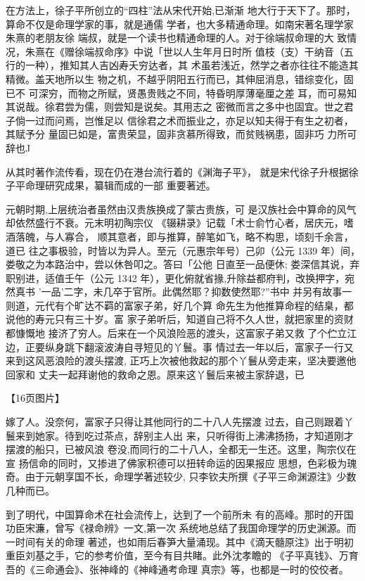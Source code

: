 在方法上，徐子平所创立的“四柱”法从宋代开始,已渐渐
地大行于天下了。那时，算命不仅是命理学家的事，就是通儒
学者，也大多精通命理。如南宋著名理学家朱熹的老朋友徐
端叔，就是一个读书也精通命理的人。对于徐端叔命理的大
致情况，朱熹在《赠徐端叔命序》中说「世以人生年月日时所
值枝（支）干纳音（五行的一种），推知其人吉凶寿夭穷达者，其
术虽若浅近，然学之者亦往往不能造其精微。盖天地所以生
物之机，不越乎阴阳五行而已，其伸屈消息，错综变化，固已不
可深穷，而物之所赋，贤愚贵贱之不同，特昏明厚薄毫厘之差
耳，而可易知其说哉。徐君尝为儒，则尝知是说矣。其用志之
密微而言之多中也固宜。世之君子倘一过而问焉，岂惟足以
信徐君之术而振业之，亦足以知夫得于有生之初者，其赋予分
量固已如是，富贵荣显，固非贪慕所得致，而贫贱祸患，固非巧
力所可辞也J

从其时著作流传看，现在仍在港台流行着的《渊海子平》，
就是宋代徐子升根据徐子平命理研究成果，纂辑而成的一部
重要著述。

元朝时期,上层统治者虽然由汉贵族换成了蒙古贵族，可
是汉族社会中算命的风气却依然盛行不衰。元末明初陶宗仪
《辍耕录》记载「术士俞竹心者，居庆元，嗜酒落魄，与人寡合，
顺其意者，即与推算，醉笔如飞，略不构思，顷刻千余言，道已
往之事极验，时皆以为异人。至元（元惠宗年号）己卯（公元
1339 年）间，娄敬之为本路治中，尝以休咎叩之。答曰「公他
日直至一品便休; 娄深信其说，弃职别进，适值壬午（公元
1342 年），更化俯就省掾,升除益都府判，改换押字，宛然真书
'一品'二字，未几卒于官所。此偶然耶？抑数使然耶?”书中
并另有故事一则道，元代有个旷达不羁的富家子弟，好几个算
命先生为他推算命程的结臬，都说他的寿元只有三十岁。富
家子弟听后，知道自己将不久人世，就把家里的资财都慷慨地
接济了穷人。后来在一个风浪险恶的渡头，这富家子弟又救
了个伫立江边，正要纵身跳下翻滚波涛自寻短见的丫鬟。事
情过去一年以后，富家子一行又来到这风恶浪险的渡头摆渡,
正巧上次被他救起的那个丫鬟从旁走来，坚决要邀他回家和
丈夫一起拜谢他的救命之恩。原来这丫鬟后来被主家辞退，已

【16页图片】

嫁了人。没奈何，富家子只得让其他同行的二十八人先摆渡
过去，自己则跟着丫鬟来到她家。待到吃过茶点，辞别主人出
来，只听得街上沸沸扬扬，才知道刚才摆渡的船只，已被风浪
卷没,而同行的二十八人，全都无一生还。这里，陶宗仪在宣
扬信命的同时，又掺进了佛家积德可以扭转命运的因果报应
思想，色彩极为瑰奇。由于元朝享国不长，命理学著述较少,
只李钦夫所撰《子平三命渊源注》少数几种而已。

到了明代，中国算命术在社会流传上，达到了一个前所未
有的高峰。那时的开国功臣宋濂，曾写《禄命辨》一文,第一次
系统地总结了我国命理学的历史渊源。而一时间有关的命理
著述，也如雨后春笋大量涌现。其中《滴天髓原注》出于明初
重臣刘基之手，它的参考价值，至今有目共睹。此外沈孝瞻的
《子平真钱》、万育吾的《三命通会》、张神峰的《神峰通考命理
真宗》等，也都是一时的佼佼者。

